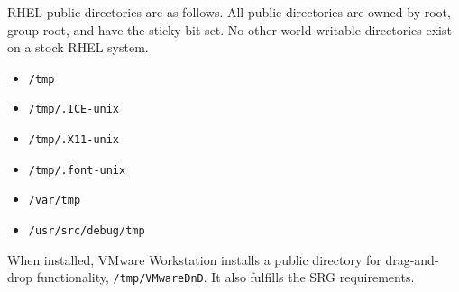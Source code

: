 RHEL public directories are as follows. All public directories are owned
by root, group root, and have the sticky bit set. No other world-writable
directories exist on a stock RHEL system.
\begin{itemize}
\item \verb!/tmp!
\item \verb!/tmp/.ICE-unix!
\item \verb!/tmp/.X11-unix!
\item \verb!/tmp/.font-unix!
\item \verb!/var/tmp!
\item \verb!/usr/src/debug/tmp!
\end{itemize}

When installed, VMware Workstation installs a public directory for
drag-and-drop functionality, \verb!/tmp/VMwareDnD!. It also fulfills the
SRG requirements.




